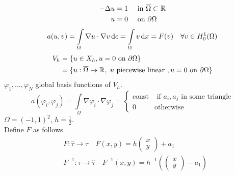 \begin{example}
	\begin{align*}
		- \Delta u &=1 \quad \text{ in } \overline{\Omega} \subset \mathbb{R}\\
		u &=0 \quad \text{ on } \partial \Omega
	\end{align*}
	\begin{equation*}
		a(u,v) = \int \limits_\Omega  \nabla u \cdot \nabla v \mathop{}\!\mathrm{d} c = \int \limits_\Omega v\mathop{}\!\mathrm{d} x = F(v) \quad \forall v \in H^1_0(\Omega)
	\end{equation*}
	\begin{align*}
		V_h &= \{ u \in X_h, u=0 \text{ on } \partial \Omega  \}\\
			&= \{ u: \overline{\Omega} \to \mathbb{R} , \ u \text{ piecewise linear }, u=0 \text{ on } \partial \Omega   \}
	\end{align*}
	$\varphi_1,\dots,\varphi_N$ global basis functions of $V_h$.
	\begin{equation*}
		a(\varphi_i,\varphi_j) = \int \limits_\Omega \nabla \varphi_i \cdot \nabla \varphi_j = 
		\begin{cases}
		\text{const} & \text{ if } a_i,a_j \text{ in some triangle}\\
		0 & \text{otherwise}
		\end{cases}
	\end{equation*}
	$\Omega = (-1,1)^2$, $h = \frac{1}{2}$.
	\\
	Define $F$ as follows
	\begin{align*}
		&{} F\colon \hat{\tau} \to \tau \quad F(x,y) = h \begin{pmatrix} x\\ y \end{pmatrix} + a_1\\
		&{} F^{-1}\colon \tau \to \hat{\tau} \quad F^{-1}(x,y) = h^{-1} \left ( \begin{pmatrix}x \\ y \end{pmatrix} - a_1 \right )
	\end{align*}
	
	
	

\end{example}
